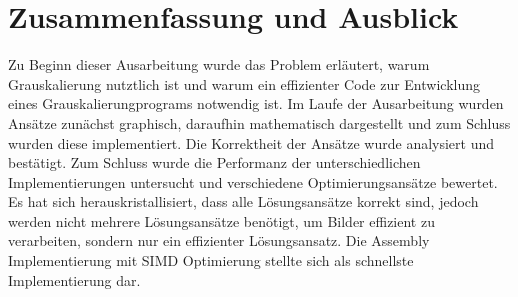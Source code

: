 \documentclass[course=asp]{aspdoc}
\begin{document}
\section{Zusammenfassung und Ausblick}
Zu Beginn dieser Ausarbeitung wurde das Problem erläutert, warum Grauskalierung nutztlich ist und warum ein effizienter Code zur Entwicklung eines Grauskalierungprograms notwendig ist. Im Laufe der Ausarbeitung wurden Ansätze zunächst graphisch, daraufhin mathematisch dargestellt und zum Schluss wurden diese implementiert. Die Korrektheit der Ansätze wurde analysiert und bestätigt. Zum Schluss wurde die Performanz der unterschiedlichen Implementierungen untersucht und verschiedene Optimierungsansätze bewertet. Es hat sich herauskristallisiert, dass alle Lösungsansätze korrekt sind, jedoch werden nicht mehrere Lösungsansätze benötigt, um Bilder effizient zu verarbeiten, sondern nur ein effizienter Lösungsansatz. Die Assembly Implementierung mit SIMD Optimierung stellte sich als schnellste Implementierung dar. 


{}
\end{document}

